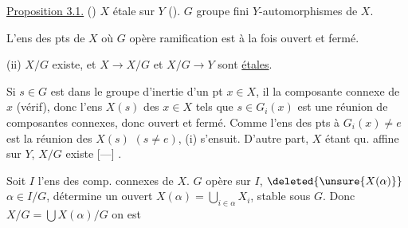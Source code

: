 \uline{Proposition 3.1.} () $X$ étale sur $Y$ ().
$G$ groupe fini  $Y$-automorphismes de $X$.

  L'ens des pts de $X$ où $G$ opère  ramification est à la fois ouvert et fermé.

(ii)  $X/G$ existe, et $X\to X/G$ et $X/G\to Y$ sont \uline{étales}.


Si $s\in G$  est dans le groupe d'inertie d'un pt $x\in X$, il  la composante connexe de $x$ (vérif), donc l'ens $X(s)$ des $x\in X$ tels que $s\in G_i(x)$ est une réunion de composantes connexes, donc ouvert et fermé.
Comme  l'ens des pts à $G_i(x)\ne e$ est la réunion des $X(s)$ $(s\ne e)$, (i) s'ensuit.
D'autre part, $X$ étant qu. affine sur $Y$, $X/G$ existe [---]
  .

Soit $I$ l'ens des comp. connexes de $X$.
$G$ opère sur $I$, 
 $\deleted{\unsure{X(\alpha)}}$ $\alpha\in I/G$, détermine un ouvert $X(\alpha)=\bigcup_{i\in\alpha}X_i$, stable sous $G$.
Donc $X/G=\bigcup X(\alpha)/G$ on est
